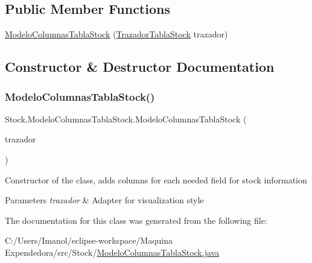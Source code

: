 \subsection*{Public Member Functions}
\begin{DoxyCompactItemize}
\item 
\mbox{\hyperlink{class_stock_1_1_modelo_columnas_tabla_stock_a8856fdceec2c8de97965596c58fbf56c}{Modelo\+Columnas\+Tabla\+Stock}} (\mbox{\hyperlink{class_stock_1_1_trazador_tabla_stock}{Trazador\+Tabla\+Stock}} trazador)
\end{DoxyCompactItemize}


\subsection{Constructor \& Destructor Documentation}
\mbox{\label{class_stock_1_1_modelo_columnas_tabla_stock_a8856fdceec2c8de97965596c58fbf56c}} 
\subsubsection{\texorpdfstring{Modelo\+Columnas\+Tabla\+Stock()}{ModeloColumnasTablaStock()}}
{\footnotesize\ttfamily Stock.\+Modelo\+Columnas\+Tabla\+Stock.\+Modelo\+Columnas\+Tabla\+Stock (\begin{DoxyParamCaption}\item[{\mbox{\hyperlink{class_stock_1_1_trazador_tabla_stock}{Trazador\+Tabla\+Stock}}}]{trazador }\end{DoxyParamCaption})}

Constructor of the class, adds columns for each needed field for stock information 
\begin{DoxyParams}{Parameters}
{\em trazador} & Adapter for visualization style \\
\hline
\end{DoxyParams}


The documentation for this class was generated from the following file\+:\begin{DoxyCompactItemize}
\item 
C\+:/\+Users/\+Imanol/eclipse-\/workspace/\+Maquina Expendedora/src/\+Stock/\mbox{\hyperlink{_modelo_columnas_tabla_stock_8java}{Modelo\+Columnas\+Tabla\+Stock.\+java}}\end{DoxyCompactItemize}
